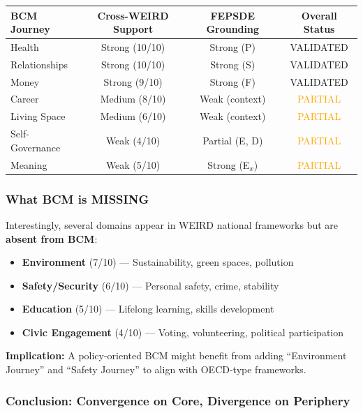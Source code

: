 \begin{center}
\begin{tabular}{@{}lccc@{}}
\toprule
\textbf{BCM Journey} & \textbf{Cross-WEIRD Support} & \textbf{FEPSDE Grounding} & \textbf{Overall Status} \\
\midrule
Health & Strong (10/10) & Strong (P) & \textcolor{green!70!black}{VALIDATED} \\
Relationships & Strong (10/10) & Strong (S) & \textcolor{green!70!black}{VALIDATED} \\
Money & Strong (9/10) & Strong (F) & \textcolor{green!70!black}{VALIDATED} \\
Career & Medium (8/10) & Weak (context) & \textcolor{orange}{PARTIAL} \\
Living Space & Medium (6/10) & Weak (context) & \textcolor{orange}{PARTIAL} \\
Self-Governance & Weak (4/10) & Partial (E, D) & \textcolor{orange}{PARTIAL} \\
Meaning & Weak (5/10) & Strong (E$_x$) & \textcolor{orange}{PARTIAL} \\
\bottomrule
\end{tabular}
\end{center}

\subsubsection{What BCM is MISSING}

Interestingly, several domains appear in WEIRD national frameworks but are \textbf{absent from BCM}:

\begin{itemize}[nosep]
\item \textbf{Environment} (7/10) --- Sustainability, green spaces, pollution
\item \textbf{Safety/Security} (6/10) --- Personal safety, crime, stability
\item \textbf{Education} (5/10) --- Lifelong learning, skills development
\item \textbf{Civic Engagement} (4/10) --- Voting, volunteering, political participation
\end{itemize}

\textbf{Implication:} A policy-oriented BCM might benefit from adding ``Environment Journey'' and ``Safety Journey'' to align with OECD-type frameworks.

\subsubsection{Conclusion: Convergence on Core, Divergence on Periphery}

